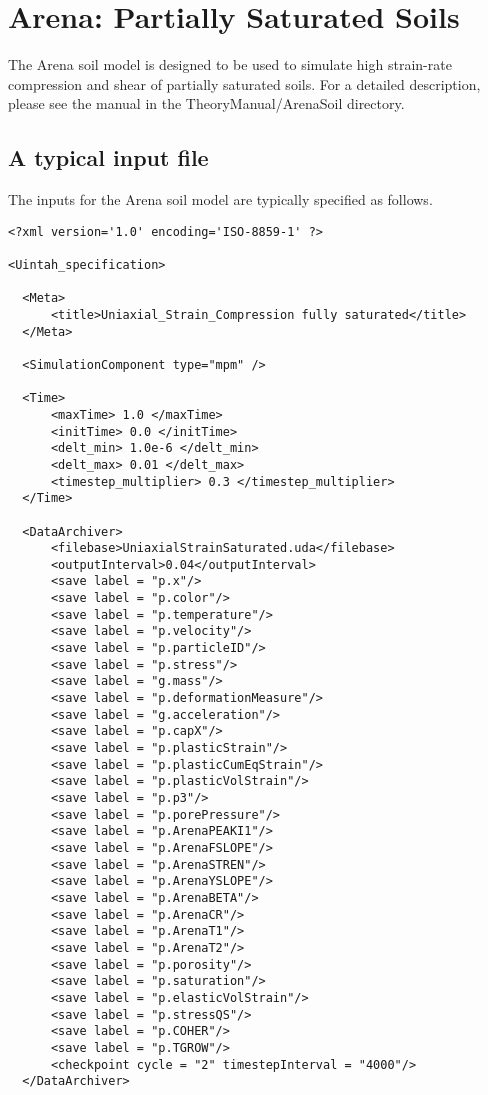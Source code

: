 \section{Arena: Partially Saturated Soils}

The Arena soil model is designed to be used to simulate high strain-rate compression and shear of 
partially saturated soils.  For a detailed description, please see
the manual in the \textsf{TheoryManual/ArenaSoil} directory.

\subsection{A typical input file}
The inputs for the Arena soil model are typically specified as follows.
\lstset{
  language=XML
}
\begin{lstlisting}
<?xml version='1.0' encoding='ISO-8859-1' ?>

<Uintah_specification>

  <Meta>
      <title>Uniaxial_Strain_Compression fully saturated</title>
  </Meta>

  <SimulationComponent type="mpm" />

  <Time>
      <maxTime> 1.0 </maxTime>
      <initTime> 0.0 </initTime>
      <delt_min> 1.0e-6 </delt_min>
      <delt_max> 0.01 </delt_max>
      <timestep_multiplier> 0.3 </timestep_multiplier>
  </Time>

  <DataArchiver>
      <filebase>UniaxialStrainSaturated.uda</filebase>
      <outputInterval>0.04</outputInterval>
      <save label = "p.x"/>
      <save label = "p.color"/>
      <save label = "p.temperature"/>
      <save label = "p.velocity"/>
      <save label = "p.particleID"/>
      <save label = "p.stress"/>
      <save label = "g.mass"/>
      <save label = "p.deformationMeasure"/>
      <save label = "g.acceleration"/>
      <save label = "p.capX"/>
      <save label = "p.plasticStrain"/>
      <save label = "p.plasticCumEqStrain"/>
      <save label = "p.plasticVolStrain"/>
      <save label = "p.p3"/>
      <save label = "p.porePressure"/>
      <save label = "p.ArenaPEAKI1"/>
      <save label = "p.ArenaFSLOPE"/>
      <save label = "p.ArenaSTREN"/>
      <save label = "p.ArenaYSLOPE"/>
      <save label = "p.ArenaBETA"/>
      <save label = "p.ArenaCR"/>
      <save label = "p.ArenaT1"/>
      <save label = "p.ArenaT2"/>
      <save label = "p.porosity"/>
      <save label = "p.saturation"/>
      <save label = "p.elasticVolStrain"/>
      <save label = "p.stressQS"/>
      <save label = "p.COHER"/>
      <save label = "p.TGROW"/>
      <checkpoint cycle = "2" timestepInterval = "4000"/>
  </DataArchiver>


\end{lstlisting}
